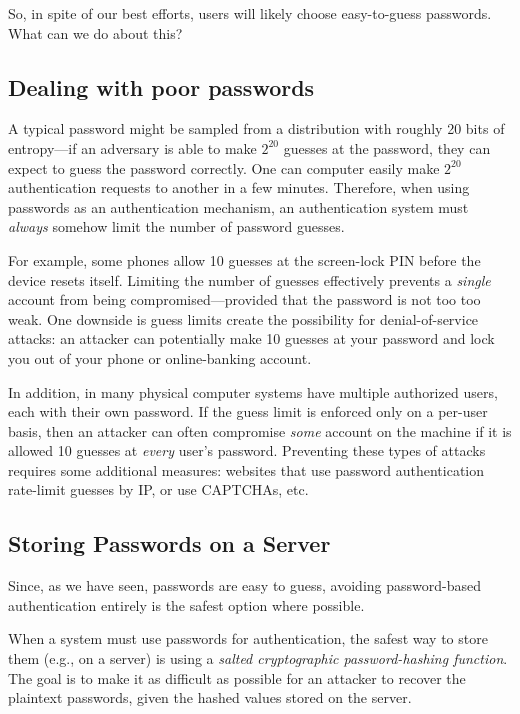 So, in spite of our best efforts, users will likely choose
easy-to-guess passwords.
What can we do about this?

\subsection{Dealing with poor passwords}
A typical password might be sampled from a distribution with roughly
20 bits of 
entropy---if an adversary is able to make $2^{20}$ guesses
at the password, they can expect to guess the password correctly.
One can computer easily make $2^{20}$
authentication requests to another in a few
minutes.
Therefore, when using passwords as an authentication
mechanism, an authentication system must \emph{always} 
somehow limit the number of password guesses.

For example, some phones allow 10 guesses at the screen-lock PIN 
before the device resets itself.
Limiting the number of guesses effectively prevents a \emph{single}
account from being compromised---provided that the password is not
too too weak.
One downside is guess limits create the possibility for denial-of-service
attacks: an attacker can potentially make 10 guesses at your password and lock
you out of your phone or online-banking account.

In addition, in many physical computer systems have multiple authorized 
users, each with their own password.
If the guess limit is enforced only on a per-user basis, then an attacker
can often compromise \emph{some} account on the machine if it is allowed
10 guesses at \emph{every} user's password.
Preventing these types of attacks requires some additional measures: websites
that use password authentication rate-limit guesses by IP, or use CAPTCHAs, etc.

\subsection{Storing Passwords on a Server}


Since, as we have seen, passwords are easy to guess, avoiding 
password-based authentication entirely is the safest option where
possible.

When a system must use passwords for authentication, the safest
way to store them (e.g., on a server) is using a
\emph{salted cryptographic password-hashing function}.
The goal is to make it as difficult as possible for an attacker
to recover the plaintext passwords, given the hashed values stored on the server.

